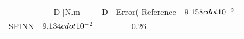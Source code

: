 \begin{tabular}{lcc}
\toprule
 & D [N.m] & D - Error(%
\midrule
Reference & $9.158\\cdot 10^{-2}$ &  \\
SPINN & $9.134\\cdot 10^{-2}$ & 0.26 \\
\bottomrule
\end{tabular}
